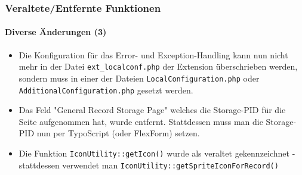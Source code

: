 \begin{frame}[fragile]
	\frametitle{Veraltete/Entfernte Funktionen}
	\framesubtitle{Diverse Änderungen (3)}

	\begin{itemize}

		\item Die Konfiguration für das Error- und Exception-Handling kann nun nicht mehr in der Datei
			\texttt{ext\_localconf.php} der Extension überschrieben werden, sondern muss in einer der Dateien
			\texttt{LocalConfiguration.php} oder \texttt{AdditionalConfiguration.php} gesetzt werden.

		\item Das Feld "General Record Storage Page" welches die Storage-PID für die Seite aufgenommen hat,
			wurde entfernt. Stattdessen muss man die Storage-PID nun per TypoScript (oder FlexForm) setzen.

		\item Die Funktion \texttt{IconUtility::getIcon()} wurde als veraltet gekennzeichnet - stattdessen
			verwendet man \texttt{IconUtility::getSpriteIconForRecord()}

	\end{itemize}

\end{frame}

